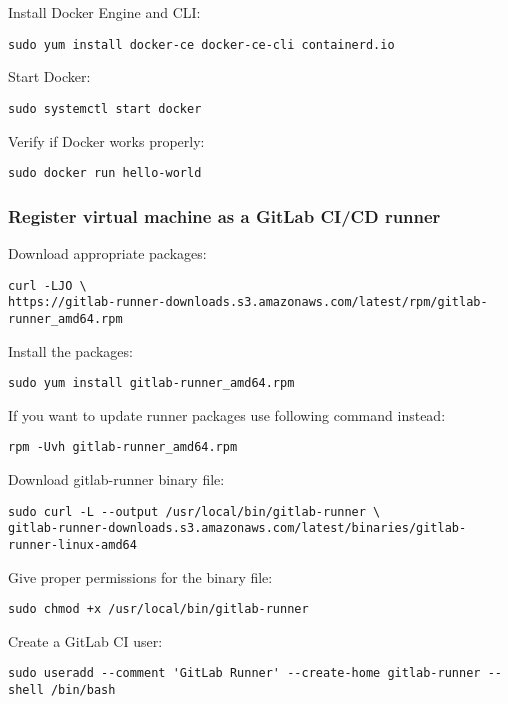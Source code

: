 \noindent
Install Docker Engine and CLI:
\begin{lstlisting}
sudo yum install docker-ce docker-ce-cli containerd.io
\end{lstlisting}

\noindent
Start Docker:
\begin{lstlisting}
sudo systemctl start docker
\end{lstlisting}

\noindent
Verify if Docker works properly:
\begin{lstlisting}
sudo docker run hello-world
\end{lstlisting}

\subsubsection*{Register virtual machine as a GitLab CI/CD runner}

\noindent
Download appropriate packages:
\begin{lstlisting}
curl -LJO \
https://gitlab-runner-downloads.s3.amazonaws.com/latest/rpm/gitlab-runner_amd64.rpm
\end{lstlisting}

\noindent
Install the packages:
\begin{lstlisting}
sudo yum install gitlab-runner_amd64.rpm
\end{lstlisting}

\noindent
If you want to update runner packages use following command instead:
\begin{lstlisting}
rpm -Uvh gitlab-runner_amd64.rpm
\end{lstlisting}

\noindent
Download gitlab-runner binary file:
\begin{lstlisting}
sudo curl -L --output /usr/local/bin/gitlab-runner \
gitlab-runner-downloads.s3.amazonaws.com/latest/binaries/gitlab-runner-linux-amd64
\end{lstlisting}

\noindent
Give proper permissions for the binary file:
\begin{lstlisting}
sudo chmod +x /usr/local/bin/gitlab-runner
\end{lstlisting}

\noindent
Create a GitLab CI user:
\begin{lstlisting}
sudo useradd --comment 'GitLab Runner' --create-home gitlab-runner --shell /bin/bash
\end{lstlisting}

